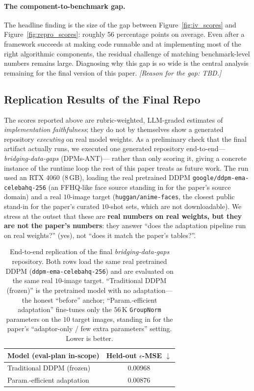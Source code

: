 \documentclass[11pt]{article}
\begin{document}
\paragraph{The component-to-benchmark gap.} The headline finding
is the size of the gap between
Figure~\ref{fig:iv_scores} and Figure~\ref{fig:repro_scores}:
roughly 56 percentage points on average. Even after a framework
succeeds at making code runnable and at implementing most of the
right algorithmic components, the residual challenge of matching
benchmark-level numbers remains large. Diagnosing why this gap
is so wide is the central analysis remaining for the final
version of this paper. \emph{[Reason for the gap: TBD.]}

\subsection{Replication Results of the Final Repo}

The scores reported above are rubric-weighted, LLM-graded estimates of
\emph{implementation faithfulness}; they do not by themselves show a
generated repository \emph{executing} on real model weights. As a
preliminary check that the final artifact actually runs, we executed one
generated repository end-to-end---\emph{bridging-data-gaps} (DPMs-ANT)---
rather than only scoring it, giving a concrete instance of the runtime
loop the rest of this paper treats as future work. The run used an RTX
4060 (8\,GB), loading the real pretrained DDPM
\texttt{google/ddpm-ema-celebahq-256} (an FFHQ-like face source standing
in for the paper's source domain) and a real $10$-image target
(\texttt{huggan/anime-faces}, the closest public stand-in for the paper's
curated $10$-shot sets, which are not downloadable). We stress at the
outset that these are \textbf{real numbers on real weights, but they are
not the paper's numbers}: they answer ``does the adaptation pipeline run
on real weights?'' (yes), not ``does it match the paper's tables?''.

\begin{table}[t]
\centering
\small
\begin{tabular}{lc}
\toprule
\textbf{Model (eval-plan in-scope)} & \textbf{Held-out $\epsilon$-MSE $\downarrow$} \\
\midrule
Traditional DDPM (frozen)        & 0.00968 \\
Param.-efficient adaptation      & 0.00876 \\
\bottomrule
\end{tabular}
\caption{End-to-end replication of the final
\emph{bridging-data-gaps} repository. Both rows load the same real
pretrained DDPM (\texttt{ddpm-ema-celebahq-256}) and are evaluated on the
same real $10$-image target. ``Traditional DDPM (frozen)'' is the
pretrained model with no adaptation---the honest ``before'' anchor;
``Param.-efficient adaptation'' fine-tunes only the $56$\,K
\texttt{GroupNorm} parameters on the $10$ target images, standing in for
the paper's ``adaptor-only / few extra parameters'' setting. Lower is
better.}
\label{tab:bridging_repro}
\end{table}
\end{document}

